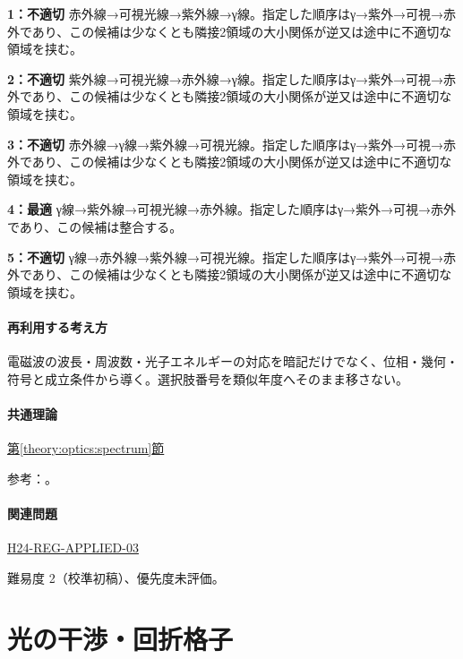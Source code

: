 \noindent\textbf{1：不適切} 赤外線→可視光線→紫外線→γ線。指定した順序はγ→紫外→可視→赤外であり、この候補は少なくとも隣接2領域の大小関係が逆又は途中に不適切な領域を挟む。\par

\noindent\textbf{2：不適切} 紫外線→可視光線→赤外線→γ線。指定した順序はγ→紫外→可視→赤外であり、この候補は少なくとも隣接2領域の大小関係が逆又は途中に不適切な領域を挟む。\par

\noindent\textbf{3：不適切} 赤外線→γ線→紫外線→可視光線。指定した順序はγ→紫外→可視→赤外であり、この候補は少なくとも隣接2領域の大小関係が逆又は途中に不適切な領域を挟む。\par

\noindent\textbf{4：最適} γ線→紫外線→可視光線→赤外線。指定した順序はγ→紫外→可視→赤外であり、この候補は整合する。\par

\noindent\textbf{5：不適切} γ線→赤外線→紫外線→可視光線。指定した順序はγ→紫外→可視→赤外であり、この候補は少なくとも隣接2領域の大小関係が逆又は途中に不適切な領域を挟む。\par

\paragraph{再利用する考え方} 電磁波の波長・周波数・光子エネルギーの対応を暗記だけでなく、位相・幾何・符号と成立条件から導く。選択肢番号を類似年度へそのまま移さない。

\paragraph{共通理論} \hyperref[theory:optics:spectrum]{第\ref*{theory:optics:spectrum}節}

\par 参考：\cite{os_spectrum}。

\paragraph{関連問題} \hyperref[q:h24-reg-applied-03]{H24-REG-APPLIED-03}

\par 難易度 2（校準初稿）、優先度未評価。

\section{光の干渉・回折格子}

